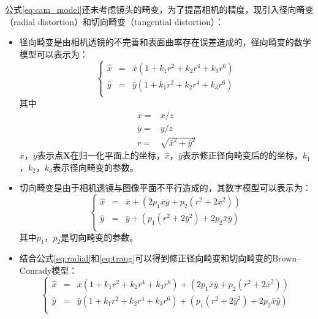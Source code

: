 公式\ref{eq:cam_model}还未考虑镜头的畸变，为了提高相机的精度，现引入径向畸变（radial distortion）和切向畸变（tangential distortion）：
\begin{itemize}
\item 径向畸变是由相机透镜的不完善和表面曲率存在误差造成的，径向畸变的数学模型可以表示为：
  \begin{equation}
    \label{eq:radial}
    \left\{
      \begin{array}{ccc}
        \hat{x}&=&\bar{x}(1 + k_1r^2 + k_2r^4 + k_3r^6)\\
        \hat{y}&=&\bar{y}(1 + k_1r^2 + k_2r^4 + k_3r^6)\\
      \end{array}
    \right.
  \end{equation}
  其中
  \begin{align}
    \bar{x} =& x/z\\
    \bar{y} =& y/z\\
    r  =& \sqrt{\bar{x}^2 + \bar{y}^2}
  \end{align}
  $\bar{x}$，$\bar{y}$表示点$\bm{X}$在归一化平面上的坐标，$\hat{x}$，$\hat{y}$表示修正径向畸变后的的坐标，$k_1$，$k_2$，$k_3$表示径向畸变的参数。
\item 切向畸变是由于相机透镜与图像平面不平行造成的，其数字模型可以表示为：
  \begin{equation}
    \label{eq:trang}
    \left\{
      \begin{array}{ccc}
        \hat{x}&=&\bar{x} + (2p_1\bar{x}\bar{y} + p_2(r^2 + 2\bar{x}^2))\\
        \hat{y}&=&\bar{y} + (p_1(r^2 + 2\bar{y}^2) + 2p_2\bar{x}\bar{y})\\
      \end{array}
    \right.
  \end{equation}
  其中$p_1$，$p_2$是切向畸变的参数。
\item 结合公式\ref{eq:radial}和\ref{eq:trang}可以得到修正径向畸变和切向畸变的Brown–Conrady模型\cite{Brown1966}：
  \begin{equation}
    \label{eq:dist}
    \left\{
      \begin{array}{ccc}
        \hat{x}&=&\bar{x}(1 + k_1r^2 + k_2r^4 + k_3r^6) + (2p_1\bar{x}\bar{y} + p_2(r^2 + 2\bar{x}^2))\\
        \hat{y}&=&\bar{y}(1 + k_1r^2 + k_2r^4 + k_3r^6) + (p_1(r^2 + 2\bar{y}^2) + 2p_2\bar{x}\bar{y})\\
      \end{array}
    \right.
  \end{equation}
\end{itemize}
